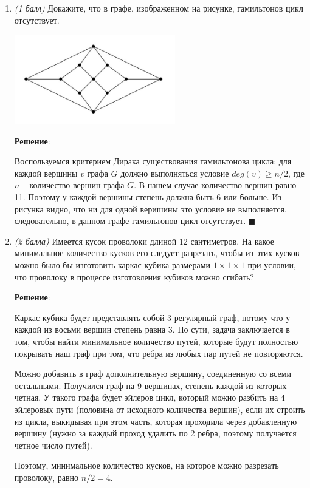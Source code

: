 \documentclass{article}
\begin{document}
\begin{enumerate}
    \item \textit{(1 балл)} Докажите, что в графе, изображенном на рисунке, гамильтонов цикл отсутствует.
    \begin{center}
        \includegraphics[width=7cm]{images/2.3.png}
    \end{center}

    \textbf{Решение}:

    Воспользуемся критерием Дирака существования гамильтонова цикла: для каждой вершины $v$ графа $G$ должно выполняться условие $deg(v) \geq n/2$, где $n$ -- количество вершин графа $G$. В нашем случае количество вершин равно 11. Поэтому у каждой вершины степень должна быть 6 или больше. Из рисунка видно, что ни для одной веришины это условие не выполняется, следовательно, в данном графе гамильтонов цикл отсутствует. $\blacksquare$
    
    \item \textit{(2 балла)} Имеется кусок проволоки длиной 12 сантиметров. На какое минимальное количество кусков его следует
    разрезать, чтобы из этих кусков можно было бы изготовить каркас кубика размерами $1\times1\times1$ при условии, что проволоку в процессе изготовления кубиков можно сгибать?

    \textbf{Решение}:
    
    Каркас кубика будет представлять собой 3-регулярный граф, потому что у каждой из восьми вершин степень равна 3. По сути, задача заключается в том, чтобы найти минимальное количество путей, которые будут полностью покрывать наш граф при том, что ребра из любых пар путей не повторяются.
    
    Можно добавить в граф дополнительную вершину, соединенную со всеми остальными. Получился граф на 9 вершинах, степень каждой из которых четная. У такого графа будет эйлеров цикл, который можно разбить на 4 эйлеровых пути (половина от исходного количества вершин), если их строить из цикла, выкидывая при этом часть, которая проходила через добавленную вершину (нужно за каждый проход удалить по 2 ребра, поэтому получается четное число путей).
    
    Поэтому, минимальное количество кусков, на которое можно разрезать проволоку, равно $n/2 = 4$.
    

\end{enumerate}
\end{document}
